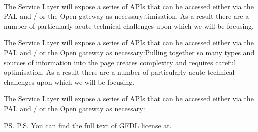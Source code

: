 \documentclass[10pt, paper=A4, parskip=full,asymTypB, subject=afteropening, subject=left,Farrukh
               enlargefirstpage ]{scrlttr2}
\begin{document}
\begin{letter}{%
\tystrrecipient \\
\tystrrecipientaddress
}
The Service Layer will expose a series of APIs that can be accessed either via the PAL and / or the Open gateway as necessary:timisation. As a result there are a number of particularly acute technical challenges upon which we will be focusing.

The Service Layer will expose a series of APIs that can be accessed either via the PAL and / or the Open gateway as necessary:Pulling together so many types and sources of information into the page creates complexity and requires careful optimisation. As a result there are a number of particularly acute technical challenges upon which we will be focusing.

The Service Layer will expose a series of APIs that can be accessed either via the PAL and / or the Open gateway as necessary:

\closing{\tystrclosing}
\ps{P.S. You can find the full text of GFDL license at.}
\end{letter}
\end{document}

